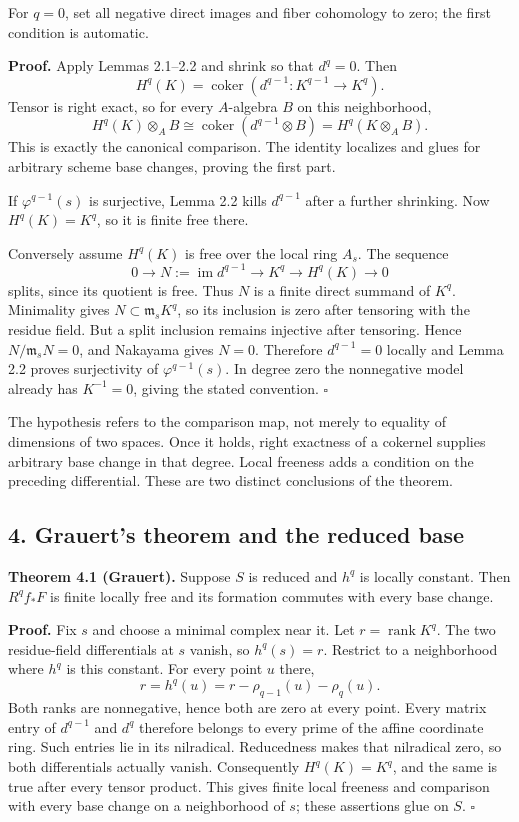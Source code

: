 \documentclass[11pt]{article}
\begin{document}
For \(q=0\), set all negative direct images and fiber cohomology to
zero; the first condition is automatic.

\textbf{Proof.} Apply Lemmas 2.1--2.2 and shrink so that \(d^q=0\). Then
\[
H^q(K)=\operatorname{coker}(d^{q-1}:K^{q-1}\to K^q).
\] Tensor is right exact, so for every \(A\)-algebra \(B\) on this
neighborhood, \[
H^q(K)\otimes_A B
\cong\operatorname{coker}(d^{q-1}\otimes B)
=H^q(K\otimes_A B).
\] This is exactly the canonical comparison. The identity localizes and
glues for arbitrary scheme base changes, proving the first part.

If \(\varphi^{q-1}(s)\) is surjective, Lemma 2.2 kills \(d^{q-1}\) after
a further shrinking. Now \(H^q(K)=K^q\), so it is finite free there.

Conversely assume \(H^q(K)\) is free over the local ring \(A_s\). The
sequence \[
0\to N:=\operatorname{im}d^{q-1}\to K^q\to H^q(K)\to0
\] splits, since its quotient is free. Thus \(N\) is a finite direct
summand of \(K^q\). Minimality gives \(N\subset\mathfrak m_sK^q\), so
its inclusion is zero after tensoring with the residue field. But a
split inclusion remains injective after tensoring. Hence
\(N/\mathfrak m_sN=0\), and Nakayama gives \(N=0\). Therefore
\(d^{q-1}=0\) locally and Lemma 2.2 proves surjectivity of
\(\varphi^{q-1}(s)\). In degree zero the nonnegative model already has
\(K^{-1}=0\), giving the stated convention. \(\square\)

The hypothesis refers to the comparison map, not merely to equality of
dimensions of two spaces. Once it holds, right exactness of a cokernel
supplies arbitrary base change in that degree. Local freeness adds a
condition on the preceding differential. These are two distinct
conclusions of the theorem.

\subsection{4. Grauert's theorem and the reduced
base}\label{grauerts-theorem-and-the-reduced-base}

\textbf{Theorem 4.1 (Grauert).} Suppose \(S\) is reduced and \(h^q\) is
locally constant. Then \(R^qf_*F\) is finite locally free and its
formation commutes with every base change.

\textbf{Proof.} Fix \(s\) and choose a minimal complex near it. Let
\(r=\operatorname{rank}K^q\). The two residue-field differentials at
\(s\) vanish, so \(h^q(s)=r\). Restrict to a neighborhood where \(h^q\)
is this constant. For every point \(u\) there, \[
r=h^q(u)=r-\rho_{q-1}(u)-\rho_q(u).
\] Both ranks are nonnegative, hence both are zero at every point. Every
matrix entry of \(d^{q-1}\) and \(d^q\) therefore belongs to every prime
of the affine coordinate ring. Such entries lie in its nilradical.
Reducedness makes that nilradical zero, so both differentials actually
vanish. Consequently \(H^q(K)=K^q\), and the same is true after every
tensor product. This gives finite local freeness and comparison with
every base change on a neighborhood of \(s\); these assertions glue on
\(S\). \(\square\)
\end{document}
